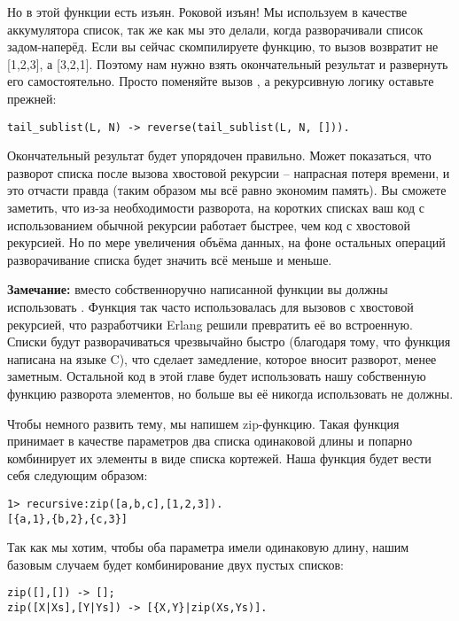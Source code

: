 Но в этой функции есть изъян.
Роковой изъян!
Мы используем в качестве аккумулятора список, так же как мы это делали, когда разворачивали список задом\--наперёд.
Если вы сейчас скомпилируете функцию, то вызов  возвратит не [1,2,3], а [3,2,1].
Поэтому нам нужно взять окончательный результат и развернуть его самостоятельно.
Просто поменяйте вызов , а рекурсивную логику оставьте прежней:
\begin{lstlisting}[style=erlang]
tail_sublist(L, N) -> reverse(tail_sublist(L, N, [])).
\end{lstlisting}

Окончательный результат будет упорядочен правильно.
Может показаться, что разворот списка после вызова хвостовой рекурсии \--- напрасная потеря времени, и это отчасти правда (таким образом мы всё равно экономим память).
Вы сможете заметить, что из\--за необходимости разворота, на коротких списках ваш код с использованием обычной рекурсии работает быстрее, чем код с хвостовой рекурсией.
Но по мере увеличения объёма данных, на фоне остальных операций разворачивание списка будет значить всё меньше и меньше.\\
\colorbox{lgray}
{
    \begin{minipage}{\linewidth}
\textbf{Замечание:} вместо собственноручно написанной функции  вы должны использовать .
Функция так часто использовалась для вызовов с хвостовой рекурсией, что разработчики Erlang решили превратить её во встроенную.
Списки будут разворачиваться чрезвычайно быстро (благодаря тому, что функция написана на языке C), что сделает замедление, которое вносит разворот, менее заметным.
Остальной код в этой главе будет использовать нашу собственную функцию разворота элементов, но больше вы её никогда использовать не должны.
    \end{minipage}
}

Чтобы немного развить тему, мы напишем zip\--функцию.
Такая функция принимает в качестве параметров два списка одинаковой длины и попарно комбинирует их элементы в виде списка кортежей.
Наша функция  будет вести себя следующим образом:
\begin{lstlisting}[style=erlang]
1> recursive:zip([a,b,c],[1,2,3]).
[{a,1},{b,2},{c,3}]
\end{lstlisting}

Так как мы хотим, чтобы оба параметра имели одинаковую длину, нашим базовым случаем будет комбинирование двух пустых списков:
\begin{lstlisting}[style=erlang]
zip([],[]) -> [];
zip([X|Xs],[Y|Ys]) -> [{X,Y}|zip(Xs,Ys)].
\end{lstlisting}

